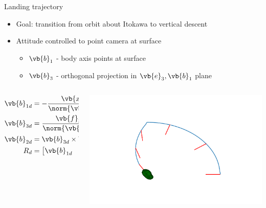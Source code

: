 \documentclass[11pt,professionalfonts]{beamer}
\begin{document}
\begin{frame}{Landing trajectory}
    \begin{itemize}
        \item Goal: transition from  orbit about Itokawa to vertical descent
        \item Attitude controlled to point camera at surface
            \begin{itemize}
                \item \( \vb{b}_1 \) - body axis points at surface
                \item \( \vb{b}_3 \) - orthogonal projection in \( \vb{e}_3, \vb{b}_1\) plane
            \end{itemize}
    \end{itemize}
    \begin{columns}
        \begin{column}{0.5\textwidth}
        \begin{align*}
            \vb{b}_{1d} &= - \frac{\vb{x}}{\norm{\vb{x}}} , \\
            \vb{b}_{3d} &= \frac{\vb{f}_3 - \parenth{\vb{f}_3 \cdot \vb{b}_{1d}} \vb{b}_{1d}}{\norm{\vb{f}_3 - \parenth{\vb{f}_3 \cdot \vb{b}_{1d}} \vb{b}_{1d}}}, \\
            \vb{b}_{2d} &= \vb{b}_{3d} \times \vb{b}_{1d} , \\
        R_d &= \begin{bmatrix} \vb{b}_{1d} & \vb{b}_{2d} & \vb{b}_{3d} \end{bmatrix} .
        \end{align*}
    \end{column}
    \begin{column}{0.5\textwidth}
        \includegraphics[width=\columnwidth,keepaspectratio,trim={30mm 20mm 30mm 20mm},clip]{figures/traj_fig.pdf}
\end{column}
\end{columns}
\end{frame}
\end{document}
